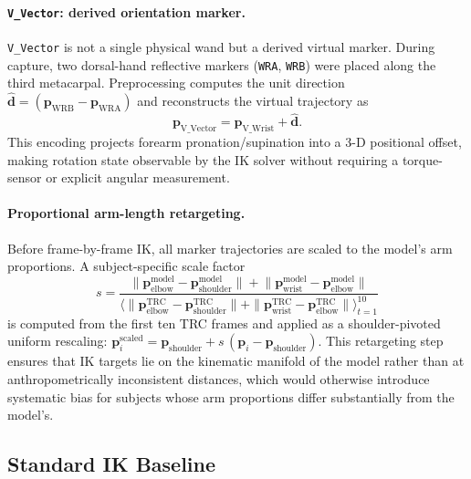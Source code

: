 \documentclass[journal,10pt,twocolumn]{IEEEtran}
\begin{document}
\paragraph{\texttt{V\_Vector}: derived orientation marker.}
\texttt{V\_Vector} is not a single physical wand but a derived virtual
marker. During capture, two dorsal-hand reflective markers
(\texttt{WRA}, \texttt{WRB}) were placed along the third metacarpal.
Preprocessing computes the unit direction
$\hat{\mathbf{d}} = (\mathbf{p}_{\text{WRB}} - \mathbf{p}_{\text{WRA}})$
and reconstructs the virtual trajectory as
\begin{equation}
  \mathbf{p}_{\text{V\_Vector}} = \mathbf{p}_{\text{V\_Wrist}} + \hat{\mathbf{d}}.
  \label{eq:vvector}
\end{equation}
This encoding projects forearm pronation/supination into a 3-D positional
offset, making rotation state observable by the IK solver without requiring
a torque-sensor or explicit angular measurement.

\paragraph{Proportional arm-length retargeting.}
Before frame-by-frame IK, all marker trajectories are scaled to the
model's arm proportions. A subject-specific scale factor
\begin{equation}
  s = \frac{
    \bigl\|\mathbf{p}^{\text{model}}_{\text{elbow}}
          - \mathbf{p}^{\text{model}}_{\text{shoulder}}\bigr\|
    + \bigl\|\mathbf{p}^{\text{model}}_{\text{wrist}}
           - \mathbf{p}^{\text{model}}_{\text{elbow}}\bigr\|}
    {\bigl\langle
      \|\mathbf{p}^{\text{TRC}}_{\text{elbow}}
        - \mathbf{p}^{\text{TRC}}_{\text{shoulder}}\|
      + \|\mathbf{p}^{\text{TRC}}_{\text{wrist}}
        - \mathbf{p}^{\text{TRC}}_{\text{elbow}}\|
    \bigr\rangle_{t=1}^{10}}
  \label{eq:scale}
\end{equation}
is computed from the first ten TRC frames and applied as a shoulder-pivoted
uniform rescaling: $\mathbf{p}^{\text{scaled}}_i =
\mathbf{p}_{\text{shoulder}} + s\,(\mathbf{p}_i - \mathbf{p}_{\text{shoulder}})$.
This retargeting step ensures that IK targets lie on the kinematic manifold
of the model rather than at anthropometrically inconsistent distances, which
would otherwise introduce systematic bias for subjects whose arm proportions
differ substantially from the model's.

\subsection{Standard IK Baseline}
\end{document}
